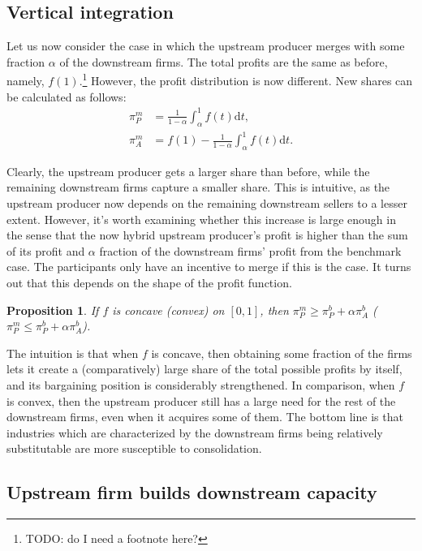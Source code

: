 \documentclass[a4paper]{article}
\newtheorem{proposition}{Proposition}
\newcommand{\dt}{\mathrm{d}t}
\begin{document}
\subsection{Vertical integration}

Let us now consider the case in which the upstream producer merges with some fraction $\alpha$ of the downstream firms.
The total profits are the same as before, namely, $f(1)$.\footnote{
    TODO: do I need a footnote here?
}
However, the profit distribution is now different.
New shares can be calculated as follows:
\begin{align}
    \pi_{P}^m & = \frac{1}{1 - \alpha} \int_\alpha^1 f(t) \dt, \\
    \pi_{A}^m & = f(1) - \frac{1}{1 - \alpha} \int_\alpha^1 f(t) \dt .
\end{align}

Clearly, the upstream producer gets a larger share than before, while the remaining downstream firms capture a smaller share.
This is intuitive, as the upstream producer now depends on the remaining downstream sellers to a lesser extent.
However, it's worth examining whether this increase is large enough in the sense that the now hybrid upstream producer's profit is higher than the sum of its profit and $\alpha$ fraction of the downstream firms' profit from the benchmark case.
The participants only have an incentive to merge if this is the case.
It turns out that this depends on the shape of the profit function.

\begin{proposition}
    \label{prop:vertical_integration}
    If $f$ is concave (convex) on $[0, 1]$, then $\pi_P^m \geq \pi_P^b + \alpha \pi_A^b$ ($\pi_P^m \leq \pi_P^b + \alpha \pi_A^b$). 
\end{proposition}

The intuition is that when $f$ is concave, then obtaining some fraction of the firms lets it create a (comparatively) large share of the total possible profits by itself, and its bargaining position is considerably strengthened.
In comparison, when $f$ is convex, then the upstream producer still has a large need for the rest of the downstream firms, even when it acquires some of them.
The bottom line is that industries which are characterized by the downstream firms being relatively substitutable are more susceptible to consolidation.

\subsection{Upstream firm builds downstream capacity}
\end{document}
